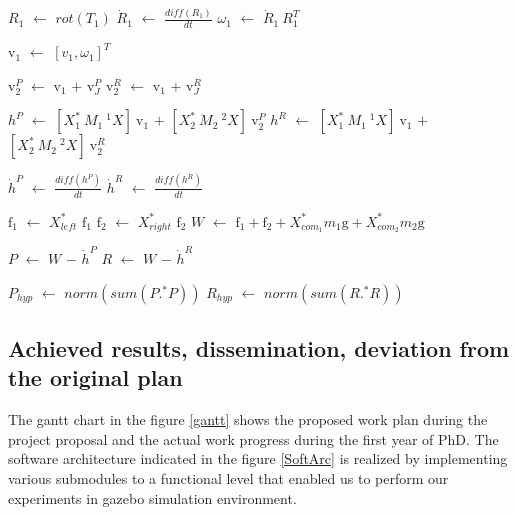 \documentclass[12pt,a4paper]{report}
\begin{document}
\begin{algorithm}[H]
\begin{algorithmic}[1]
             \STATE $R_1$ $\leftarrow$ $rot(T_1)$
             \STATE $\dot{R}_1$ $\leftarrow$ $\frac{diff(R_1)}{dt}$
             \STATE $\omega_{1}$ $\leftarrow$ $\dot{R}_1 \ R_1^T$
             
             \STATE $\mathrm{v}_1$ $\leftarrow$ $[v_{1},\omega_{1}]^T$
               
             \STATE $\mathrm{v}^P_2$ $\leftarrow$ $\mathrm{v}_1$ $+$ $\mathrm{v}_J^P$
             \STATE $\mathrm{v}^R_2$ $\leftarrow$ $\mathrm{v}_1$ $+$ $\mathrm{v}_J^R$
        
        
             \STATE $h^P$ $\leftarrow$ $[{X}_1^* \ M_1 \ ^1{X}] \ \mathrm{v}_1$ $+$ $[{X}_2^* \ M_2 \ ^2{X}] \ \mathrm{v}_2^P$
             \STATE $h^R$ $\leftarrow$ $[{X}_1^* \ M_1 \ ^1{X}] \ \mathrm{v}_1$ $+$ $[{X}_2^* \ M_2 \ ^2X] \ \mathrm{v}_2^R$
             
             \STATE $\dot{h}^P$ $\leftarrow$ $\frac{diff(h^P)}{dt}$
             \STATE $\dot{h}^R$ $\leftarrow$ $\frac{diff(h^R)}{dt}$
             
             \STATE $\text{f}_1$ $\leftarrow$ $X_{left}^*$ $\text{f}_1$
             \STATE $\text{f}_2$ $\leftarrow$ $X_{right}^*$ $\text{f}_2$
             \STATE $W$ $\leftarrow$ $\text{f}_1 + \text{f}_2 + {X_{{com}_1}^*} m_1 \text{g} + {X_{{com}_2}^*} m_2 \text{g} $
             
             \newpage
             
             \STATE $P$ $\leftarrow$ $W$ $-$ $\dot{h}^P$
             \STATE $R$ $\leftarrow$ $W$ $-$ $\dot{h}^R$
        
           
           
        \ENDFOR    
        \STATE $P_{hyp}$ $\leftarrow$ $norm(sum(P.^*P))$ 
        \STATE $R_{hyp}$ $\leftarrow$ $norm(sum(R.^*R))$      
    \end{algorithmic}
\end{algorithm}




\subsection{Achieved results, dissemination, deviation from the original plan}
The gantt chart in the figure \ref{gantt} shows the proposed work plan during the project proposal and the actual work progress during the first year of PhD. The software architecture indicated in the figure \ref{SoftArc} is realized by implementing various submodules to a functional level that enabled us to perform our experiments in gazebo simulation environment.
\end{document}
